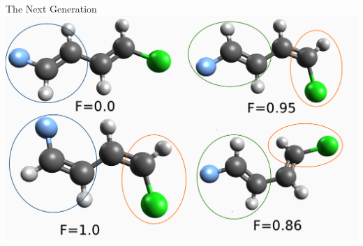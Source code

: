 \documentclass[10pt]{beamer}
\begin{document}
{{%
\begin{frame}{The Next Generation}
    \includegraphics[width=\linewidth]{images/nextgen.png}
\end{frame}
}


}
\end{document}
